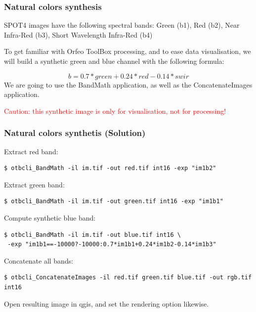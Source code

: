 \documentclass[8pt]{beamer}
\begin{document}
\begin{frame}
\frametitle{Natural colors synthesis} 
SPOT4 images have the following spectral bands: Green (b1), Red (b2), Near Infra-Red (b3), Short Wavelength Infra-Red (b4)

To get familiar with Orfeo ToolBox processing, and to ease data
visualisation, we will build a synthetic green and blue channel with the following formula:

\begin{equation}
b=0.7*green+0.24*red-0.14*swir
\end{equation}
We are going to use the BandMath application, as well as the ConcatenateImages application.

\textcolor{red}{Caution: this synthetic image is only for visualisation, not for processing!}

\end{frame}
\begin{frame}[fragile]
\frametitle{Natural colors synthetis (Solution)}
Extract red band:
\begin{verbatim}
$ otbcli_BandMath -il im.tif -out red.tif int16 -exp "im1b2"
\end{verbatim}
Extract green band:
\begin{verbatim}
$ otbcli_BandMath -il im.tif -out green.tif int16 -exp "im1b1"
\end{verbatim}
Compute synthetic blue band:
\begin{verbatim}
$ otbcli_BandMath -il im.tif -out blue.tif int16 \
 -exp "im1b1==-10000?-10000:0.7*im1b1+0.24*im1b2-0.14*im1b3"
\end{verbatim}
Concatenate all bands:
\begin{verbatim}
$ otbcli_ConcatenateImages -il red.tif green.tif blue.tif -out rgb.tif int16
\end{verbatim}

Open resulting image in qgis, and set the rendering option likewise.

\end{frame}
\end{document}
